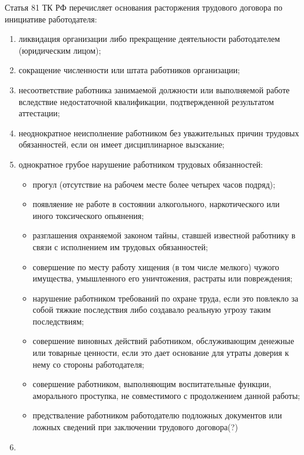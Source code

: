Статья 81 ТК РФ перечисляет основания расторжения трудового договора по инициативе работодателя:
\begin{enumerate}
	\item ликвидация организации либо прекращение деятельности работодателем (юридическим лицом);
	\item сокращение численности или штата работников организации;
	\item несоответствие работника занимаемой должности или выполняемой работе вследствие недостаточной квалификации, подтвержденной результатом аттестации;
	\item неоднократное неисполнение работником без уважительных причин трудовых обязанностей, если он имеет дисциплинарное вызскание;
	\item однократное грубое нарушение работником трудовых обязанностей:
	\begin{itemize}
		\item прогул (отсутствие на рабочем месте более четырех часов подряд);
		\item появляение не работе в состоянии алкогольного, наркотического или иного токсического опьянения;
		\item разглашения охраняемой законом тайны, ставшей известной работнику в связи с исполнением им трудовых обязанностей;
		\item совершение по месту работу хищения (в том числе мелкого) чужого имущества, умышленного его уничтожения, растраты или повреждения;
		\item нарушение работником требований по охране труда, если это повлекло за собой тяжкие последствия либо создавало реальную угрозу таким последствиям;
		\item совершение виновных действий работником, обслуживающим денежные или товарные ценности, если это дает основание для утраты доверия к нему со стороны работодателя;
		\item совершение работником, выполняющим воспитательные функции, аморального проступка, не совместимого с продолжением данной работы;
		\item предстваление работником работодателю подложных документов или ложных сведений при заключении трудового договора(?) 
	\end{itemize} 
	\item
\end{enumerate}

